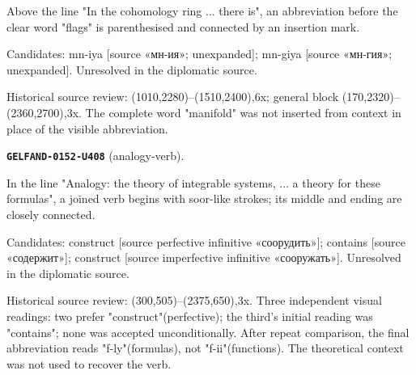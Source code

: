 Above the line "In the cohomology ring ... there is", an abbreviation before the clear word "flags" is parenthesised and connected by an insertion mark.\par
Candidates: mn-iya [source «мн-ия»; unexpanded]; mn-giya [source «мн-гия»; unexpanded]. Unresolved in the diplomatic source.\par
Historical source review: (1010,2280)–(1510,2400),6x; general block (170,2320)–(2360,2700),3x. The complete word "manifold" was not inserted from context in place of the visible abbreviation.\par\medskip
\par\noindent\leavevmode{}\label{GELFAND-0152-U408}\textbf{\texttt{GELFAND-0152-U408}} (analogy-verb).\nopagebreak[4]\par
In the line "Analogy: the theory of integrable systems, ... a theory for these formulas", a joined verb begins with soor-like strokes; its middle and ending are closely connected.\par
Candidates: construct [source perfective infinitive «соорудить»]; contains [source «содержит»]; construct [source imperfective infinitive «сооружать»]. Unresolved in the diplomatic source.\par
Historical source review: (300,505)–(2375,650),3x. Three independent visual readings: two prefer "construct"(perfective); the third's initial reading was "contains"; none was accepted unconditionally. After repeat comparison, the final abbreviation reads "f-ly"(formulas), not "f-ii"(functions). The theoretical context was not used to recover the verb.\par\medskip
